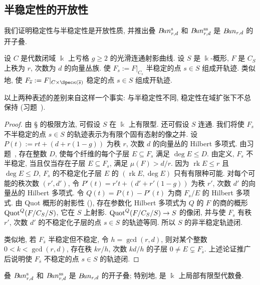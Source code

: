 \subsection{半稳定性的开放性}\label{src:9.2.2-subsection}
我们证明稳定性与半稳定性是开放性质, 并推出叠 $B\!un_{r,d}^{\mathrm s}$ 和 $B\!un_{r,d}^{\mathrm{ss}}$ 是 $B\!un_{r,d}$ 的开子叠.
\begin{theorem}\label{src:9.2.4}
设 $C$ 是代数闭域 $\Bbbk$ 上亏格 $g\geq2$ 的光滑连通射影曲线. 设 $S$ 是 $\Bbbk$-概形, $F$ 是 $C_S$ 上秩为 $r$, 次数为 $d$ 的向量丛族. 使 $F_s:=F|_{C_s}$ 半稳定的点 $s\in S$ 组成开轨迹. 类似地, 使 $F_{\overline s}:=F|_{C\times\Spec\kappa(\overline s)}$ 稳定的点 $s\in S$ 组成开轨迹.
\end{theorem}
\begin{remark}\label{src:9.2.5}
以上两种表述的差别来自这样一个事实: 与半稳定性不同, 稳定性在域扩张下不总保持 (习题~).
\end{remark}
\begin{proof}
由 \S{} 的极限方法, 可假设 $S$ 在 $\Bbbk$ 上有限型. 还可假设 $S$ 连通. 我们将使 $F_s$ 不半稳定的点 $s\in S$ 的轨迹表示为有限个固有态射的像之并. 设 $P(t):=rt+(d+r(1-g))$ 为秩 $r$, 次数 $d$ 的向量丛的 Hilbert 多项式. 由习题~, 存在整数 $D$, 使每个纤维的每个子层 $E\subseteq F_s$ 满足 $\deg E\leq D$. 由定义, $F_s$ 不半稳定, 当且仅当存在子层 $E\subseteq F_s$, 满足 $\mu(F)>d/r$. 因为 $\operatorname{rk}E\leq r$ 且 $\deg E\leq D$, $F_s$ 的不稳定化子层 $E$ 的 $(\operatorname{rk}E,\deg E)$ 只有有限种可能. 对每个可能的秩次数 $(r',d')$, 令 $P'(t)=r't+(d'+r'(1-g))$ 为秩 $r'$, 次数 $d'$ 的向量丛的 Hilbert 多项式. 令 $Q(t)=P(t)-P'(t)$ 为商 $F_s/E$ 的 Hilbert 多项式. 由 Quot 概形的射影性 (), 存在参数化 Hilbert 多项式为 $Q$ 的 $F$ 的商的概形 $\operatorname{Quot}^Q(F/C_S/S)$, 它在 $S$ 上射影. $\operatorname{Quot}^Q(F/C_S/S)\to S$ 的像闭, 并与使 $F_s$ 有秩 $r'$, 次数 $d'$ 的不稳定化子层的点 $s\in S$ 的轨迹等同. 所以 $S$ 的非半稳定轨迹闭.

类似地, 若 $F_{\overline s}$ 半稳定但不稳定, 令 $h=\gcd(r,d)$, 则对某个整数 $0<k<\gcd(r,d)$, 存在秩 $kr/h$, 次数 $kd/h$ 的子层 $0\ne E\subsetneq F_{\overline s}$. 上述论证推广后说明使 $F_{\overline s}$ 不稳定的点 $s\in S$ 的轨迹闭.
\end{proof}
\begin{corollary}\label{src:9.2.6}
叠 $B\!un_{r,d}^{\mathrm s}$ 和 $B\!un_{r,d}^{\mathrm{ss}}$ 是 $B\!un_{r,d}$ 的开子叠; 特别地, 是 $\Bbbk$ 上局部有限型代数叠.
\end{corollary}
